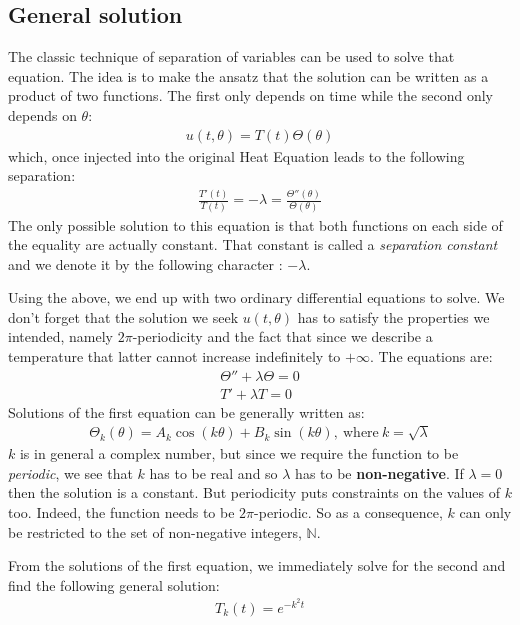 \documentclass[10pt]{article}
\begin{document}
\subsection{General solution}

The classic technique of separation of variables can be used to solve that equation. The idea is to make the ansatz that the solution can be written as a product of two functions. The first only depends on time while the second only depends on $\theta$:
\begin{eqnarray}
u(t,\theta)=T(t)\Theta(\theta)
\end{eqnarray}
which, once injected into the original Heat Equation leads to the following separation:
\begin{eqnarray}
\frac{T'(t)}{T(t)} = -\lambda = \frac{\Theta ''(\theta)}{\Theta(\theta)}
\end{eqnarray}
The only possible solution to this equation is that both functions on each side of the equality are actually constant. That constant is called a \textit{separation constant} and we denote it by the following character : $-\lambda$.

Using the above, we end up with two ordinary differential equations to solve. We don't forget that the solution we seek $u(t,\theta)$ has to satisfy the properties we intended, namely $2\pi$-periodicity and the fact that since we describe a temperature that latter cannot increase indefinitely to $+\infty$. The equations are:
\begin{eqnarray}
\Theta '' + \lambda \Theta = 0 \nonumber \\
T' + \lambda T = 0
\end{eqnarray}
Solutions of the first equation can be generally written as:
\begin{eqnarray}
\Theta_{k}(\theta) = A_{k}\cos(k\theta) + B_{k}\sin(k\theta),~\text{where}~k=\sqrt{\lambda}
\end{eqnarray}
$k$ is in general a complex number, but since we require the function to be \textit{periodic}, we see that $k$ has to be real and so $\lambda$ has to be \textbf{non-negative}. If $\lambda=0$ then the solution is a constant. But periodicity puts constraints on the values of $k$ too. Indeed, the function needs to be $2\pi$-periodic. So as a consequence, $k$ can only be restricted to the set of non-negative integers, $\mathbb{N}$.

From the solutions of the first equation, we immediately solve for the second and find the following general solution:
\begin{eqnarray}
T_{k}(t) = e^{-k^2 t}
\end{eqnarray}
\end{document}

